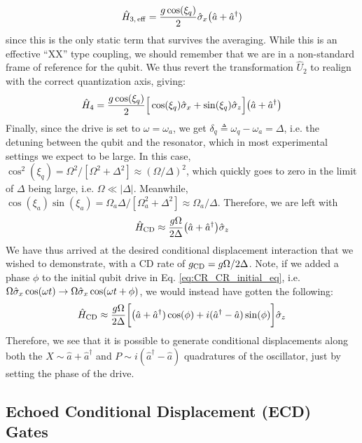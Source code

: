 \begin{equation}
\hat{H}_{3, \rm\, eff} = \frac{g\cos(\xi_q)}{2} \hat{\sigma}_x\big(\hat{a}+ \hat{a}^\dagger)
\end{equation}
since this is the only static term that survives the averaging. While this is an effective ``XX'' type coupling, we should remember that we are in a non-standard frame of reference for the qubit. We thus revert the transformation $\hat{U}_2$ to realign with the correct quantization axis, giving:
\begin{equation}
\hat{H}_4 =    \frac{g\cos(\xi_q)}{2} \Big[\cos(\xi_q)\hat{\sigma}_x +\sin(\xi_q)\hat{\sigma}_z\Big]\big(\hat{a}+\hat{a}^\dagger\big)
\end{equation}
Finally, since the drive is set to $\omega = \omega_a$, we get $\delta_q \triangleq \omega_q - \omega_a = \Delta$, i.e. the detuning between the qubit and the resonator, which in most experimental settings we expect to be large. In this case, $\cos^2(\xi_q)= \Omega^2 / [\Omega^2 + \Delta^2] \approx (\Omega/\Delta)^2$, which quickly goes to zero in the limit of $\Delta$ being large, i.e. $\Omega \ll |\Delta|$. Meanwhile, $\cos(\xi_a)\sin(\xi_a)= \Omega_a\Delta / [\Omega_a^2 + \Delta^2] \approx \Omega_a /\Delta$. Therefore, we are left with
\begin{equation}
\hat{H}_{\rm CD} \approx \frac{g\Omega }{2\Delta} \big(\hat{a}+\hat{a}^\dagger\big)\hat{\sigma}_z
\end{equation}
We have thus arrived at the desired conditional displacement interaction that we wished to demonstrate, with a CD rate of $g_{\rm CD} = g\Omega/2\Delta$. Note, if we added a phase $\phi$ to the initial qubit drive in Eq. \eqref{eq:CR_CR_initial_eq}, i.e. $\Omega\hat{\sigma}_x\cos(\omega t) \to \Omega\hat{\sigma}_x\cos(\omega t + \phi)$, we would instead have gotten the following:
\begin{equation}
\hat{H}_{\rm CD} \approx \frac{g\Omega }{2\Delta}\bigg[\big(\hat{a}+\hat{a}^\dagger)\cos(\phi) + i(\hat{a}^\dagger -\hat{a})\sin(\phi)\bigg]\hat{\sigma}_z 
\end{equation}
Therefore, we see that it is possible to generate conditional displacements along both the $X \sim \hat{a}+\hat{a}^\dagger$ and $P \sim i(\hat{a}^\dagger -\hat{a})$ quadratures of the oscillator, just by setting the phase of the drive.

\subsection{Echoed Conditional Displacement (ECD) Gates}

